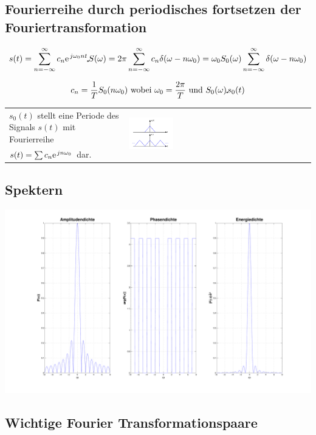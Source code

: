 \subsection{Fourierreihe durch periodisches fortsetzen der Fouriertransformation}
\[
s(t) = \sum\limits_{n=-\infty}^{\infty} c_n \e^{j\omega_0 n t} \FT S(\omega) = 2\pi \sum\limits_{n=-\infty}^{\infty}c_n \delta(\omega - n\omega_0)
= \omega_0 S_0(\omega) \sum\limits_{n=-\infty}^{\infty} \delta(\omega-n\omega_0)
\] 

\[
c_n = \frac{1}{T}S_0(n\omega_0) \text{ wobei } \omega_0 = \frac{2\pi}{T} \text{ und } S_0(\omega) \IFT s_0(t)
\]

\begin{tabular}{L{9cm}C{9cm}}
$s_0(t)$ stellt eine Periode des Signals $s(t)$ mit Fourierreihe
&  \\
$s(t) = \sum c_n \e^{jn\omega_0}$ dar. & \\
\end{tabular}


\subsection{Spektern}
\includegraphics[width=\textwidth,trim=1cm 1cm 1cm 1cm]{content/appendix/Spektern.pdf}
	
\subsection{Wichtige Fourier Transformationspaare}
  
	
